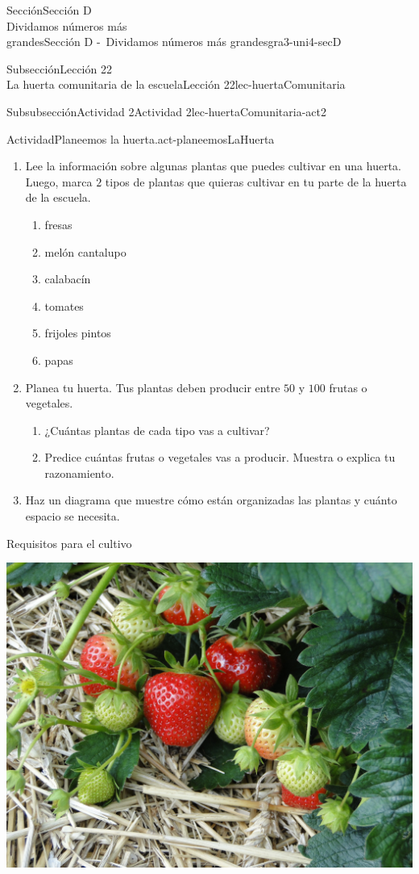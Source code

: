\begin{sectionptx}{Sección}{{\Large Sección D\\}Dividamos números más\\grandes}{}{Sección D -~Dividamos números más grandes}{}{}{gra3-uni4-secD}
\begin{subsectionptx}{Subsección}{{\normalsize Lección 22\\[-0.05cm]}La huerta comunitaria de la escuela}{}{Lección 22}{}{}{lec-huertaComunitaria}
\begin{subsubsectionptx}{Subsubsección}{Actividad 2}{}{Actividad 2}{}{}{lec-huertaComunitaria-act2}
\begin{activity}{Actividad}{Planeemos la huerta.}{act-planeemosLaHuerta}%
%
\begin{enumerate}
\item{}Lee la información sobre algunas plantas que puedes cultivar en una huerta. Luego, marca \(2\) tipos de plantas que quieras cultivar en tu parte de la huerta de la escuela.%
%
\begin{enumerate}
\item{}fresas%
\item{}melón cantalupo%
\item{}calabacín%
\item{}tomates%
\item{}frijoles pintos%
\item{}papas%
\end{enumerate}
\item{}Planea tu huerta. Tus plantas deben producir entre \(50\) y \(100\) frutas o vegetales.%
%
\begin{enumerate}
\item{}¿Cuántas plantas de cada tipo vas a cultivar?%
\item{}Predice cuántas frutas o vegetales vas a producir. Muestra o explica tu razonamiento.%
\end{enumerate}
\item{}Haz un diagrama que muestre cómo están organizadas las plantas y cuánto espacio se necesita.%
\end{enumerate}
\newpage
\alert{Requisitos para el cultivo}%
\begin{sidebyside}{2}{0.025}{0.025}{0.05}%
\begin{sbspanel}{0.45}%
\includegraphics[max width=0.8\linewidth, center]{external/jpg-source/3-4-D-22 Act1-Fresas.jpg}

\end{sbspanel}
\end{sidebyside}
\end{activity}
\end{subsubsectionptx}
\end{subsectionptx}
\end{sectionptx}
